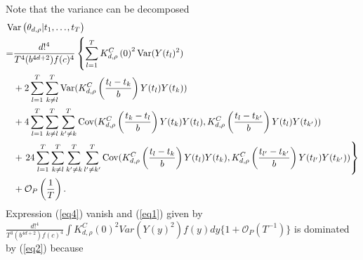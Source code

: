 Note that the variance can be decomposed
\begin{align}
&\hspace{-0.3cm}\var \left(\theta_{d,\rho} | t_1, \dots, t_T \right)  \\
\label{eq1}
=& \frac{d!^4 }{T^4 (b^{4d+2})f(c)^4} \left\{ \sum_{l=1}^T K_{d,\rho}^{C} \left(0 \right)^2 \var(  Y(t_l)^2  )  \right. \\
\label{eq2}
&+ 2\sum_{l=1}^T \sum_{k \neq l}^T \var( K_{d,\rho}^{C} \left(\frac{t_{l}-t_{k}}{b} \right) Y(t_{l}) Y(t_{k})) \\
\label{eq3}
&+ 4 \sum_{l=1}^T \sum_{k \neq l}^T \sum_{k' \neq k }^T  \cov( K_{d,\rho}^{C} \left(\frac{t_{k}-t_{l}}{b} \right) Y(t_{k}) Y(t_{l}) , K_{d,\rho}^{C} \left(\frac{t_{l}-t_{k'}}{b} \right) Y(t_{l}) Y(t_{k'}))\\
\label{eq4}
&+ \left.24 \sum_{l=1}^T \sum_{k \neq l}^T \sum_{k' \neq k }^T \sum_{l' \neq k' }^T \cov( K_{d,\rho}^{C} \left(\frac{t_{l}-t_{k}}{b} \right) Y(t_{l}) Y(t_{k}) , K_{d,\rho}^{C} \left(\frac{t_{l'}-t_{k'}}{b} \right) Y(t_{l'}) Y(t_{k'})) \right\}\\
&+ \mathcal{O}_P \left( \frac{1}{T} \right).
\end{align}
Expression (\ref{eq4}) vanish and (\ref{eq1}) given by $\frac{d!^4 }{T^3 (b^{4d+2})f(c)^4} \int K_{d,\rho}^{C} \left(0 \right)^2 Var(  Y(y)^2  ) f(y) dy \{1+ \mathcal{O}_P (T^{-1})\}$ is dominated by (\ref{eq2}) because

